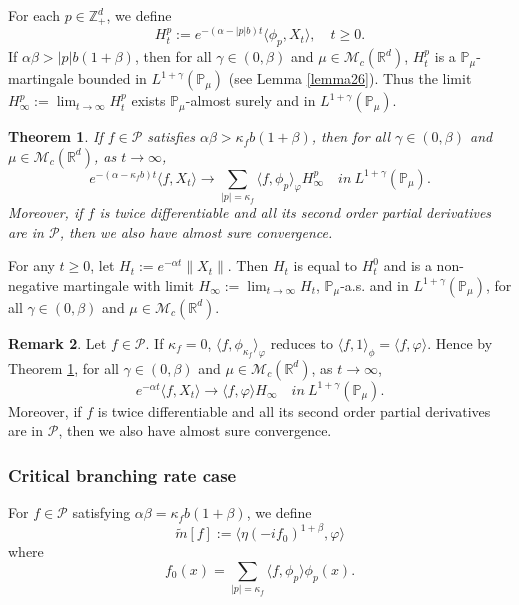 \documentclass[12pt,a4paper]{amsart}
\theoremstyle{plain}
\newtheorem{thm}{Theorem}[section]
\theoremstyle{definition}
\newtheorem{rem}[thm]{Remark}
\numberwithin{equation}{section}
\begin{document}
For each $p\in \mathbb{Z}_+^d$, we define
$$H_t^p:= e^{-(\alpha-|p|b)t}\langle\phi_p,X_t\rangle,\quad t\geq 0.$$
If $\alpha\beta>|p|b(1+\beta)$, then for all $\gamma\in (0, \beta)$ and $\mu\in \mathcal M_c(\mathbb R^d)$,
   $H_t^p$ is a $\mathbb{P}_{\mu}$-martingale bounded in
   $L^{1+\gamma}(\mathbb{P}_{\mu})$ (see Lemma \ref{lemma26}).
  Thus the limit $H^p_{\infty}:=\lim_{t\rightarrow \infty}H_t^p$ exists $\mathbb{P}_{\mu}$-almost surely and in $L^{1+\gamma}(\mathbb{P}_{\mu})$.
 \begin{thm}\label{Theorem11}
     If $f \in \mathcal{P}$ satisfies $\alpha\beta>\kappa_fb(1+\beta)$, then for
all $\gamma\in (0, \beta)$ and  $\mu\in \mathcal M_c(\mathbb R^d)$,
     as $t\rightarrow \infty$,
     $$e^{-(\alpha-\kappa_fb)t}\langle f, X_t\rangle \rightarrow\sum_{|p|=\kappa_f}\langle f, \phi_p\rangle_{\varphi} H_{\infty}^p \quad in~ L^{1+\gamma}(\mathbb{P}_{\mu}).$$
Moreover, if $f$ is twice differentiable and all its second order partial derivatives are in $\mathcal{P}$, then we also have almost sure convergence.
 \end{thm}
For any $t\geq 0$, let $H_t:=e^{-\alpha t}\|X_t\|$. Then $H_t$ is equal to $H_t^0$ and is a non-negative martingale with limit $H_{\infty}:=\lim_{t\rightarrow\infty}H_t$,  $\mathbb{P}_{\mu}$-a.s. and in $L^{1+\gamma}(\mathbb{P}_{\mu})$, for all $\gamma\in (0, \beta)$ and $\mu\in \mathcal M_c(\mathbb R^d)$.
 \begin{rem}
Let $f \in \mathcal{P}$.  If $\kappa_f=0$,
    $\langle f, \phi_{\kappa_f}\rangle_{\varphi}$ reduces to $\langle f, 1\rangle_\phi=\langle f,\varphi\rangle$. Hence by Theorem \ref{Theorem11},
for all $\gamma\in (0, \beta)$ and  $\mu\in \mathcal M_c(\mathbb R^d)$, as $t\rightarrow \infty$,
     $$e^{-\alpha t}\langle f, X_t\rangle \rightarrow \langle f, \varphi\rangle H_{\infty} \quad in~ L^{1+\gamma}(\mathbb{P}_{\mu}).$$
    Moreover, if $f$ is twice differentiable and all its second order partial derivatives are in $\mathcal{P}$, then we also have almost sure convergence.
 \end{rem}

\subsubsection{Critical branching rate case}
    For $f\in \mathcal{P}$ satisfying $\alpha\beta=\kappa_f b(1+\beta)$, we define
\begin{equation}\label{tilde-m}
    \widetilde{m}[f]
    := \langle \eta (-if_0)^{1+\beta},\varphi\rangle
\end{equation}
    where
\begin{equation}\label{phif}
    f_0(x)
    =\sum_{|p|=\kappa_f}\langle f,\phi_p\rangle\phi_p(x).
\end{equation}
\end{document}
